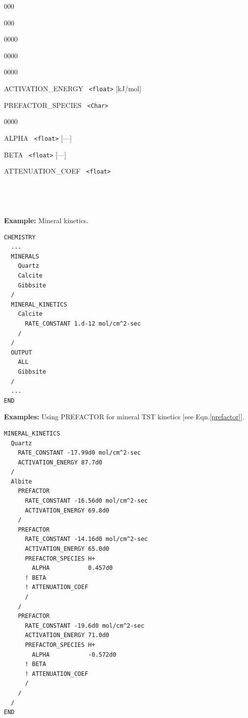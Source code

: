 \begin{deflist}{000}
\begin{deflist}{000}
\begin{deflist}{0000}
\begin{deflist}{0000}
\begin{deflist}{0000}
\item [ACTIVATION\_ENERGY] \ {\tt <float>} [kJ/mol] 
\item [PREFACTOR\_SPECIES] \ {\tt <Char>}
\begin{deflist}{0000}
\item [ALPHA] \ {\tt <float>} [---]
\item [BETA] \ {\tt <float>} [---]
\item [ATTENUATION\_COEF] \ {\tt <float>}
\end{deflist}
\item [\keyend]
\end{deflist}
\item [\keyend]
\end{deflist}

~\\

\item [\keyend]
\end{deflist}
\item [\keyend] ~
\end{deflist}

\begin{mdframed}
{\bf Example:} Mineral kinetics.
\footnotesize
\begin{verbatim}
CHEMISTRY
  ...
  MINERALS
    Quartz
    Calcite
    Gibbsite
  /
  MINERAL_KINETICS
    Calcite
      RATE_CONSTANT 1.d-12 mol/cm^2-sec
    /
  /
  OUTPUT
    ALL
    Gibbsite
  /
  ...
END
\end{verbatim}
\normalsize
\end{mdframed}

\begin{mdframed}
\noindent
{\bf Examples:}
Using PREFACTOR for mineral TST kinetics [see Eqn.\eqref{prefactor}].
\footnotesize
\begin{verbatim}
MINERAL_KINETICS
  Quartz 
    RATE_CONSTANT -17.99d0 mol/cm^2-sec
    ACTIVATION_ENERGY 87.7d0
  /
  Albite 
    PREFACTOR
      RATE_CONSTANT -16.56d0 mol/cm^2-sec
      ACTIVATION_ENERGY 69.8d0
    /
    PREFACTOR
      RATE_CONSTANT -14.16d0 mol/cm^2-sec
      ACTIVATION_ENERGY 65.0d0
      PREFACTOR_SPECIES H+
        ALPHA           0.457d0
      ! BETA
      ! ATTENUATION_COEF
      /
    /
    PREFACTOR
      RATE_CONSTANT -19.6d0 mol/cm^2-sec
      ACTIVATION_ENERGY 71.0d0
      PREFACTOR_SPECIES H+
        ALPHA           -0.572d0
      ! BETA
      ! ATTENUATION_COEF
      /
    /
  /
END
\end{verbatim}
\normalsize
\end{mdframed}


\end{deflist}
